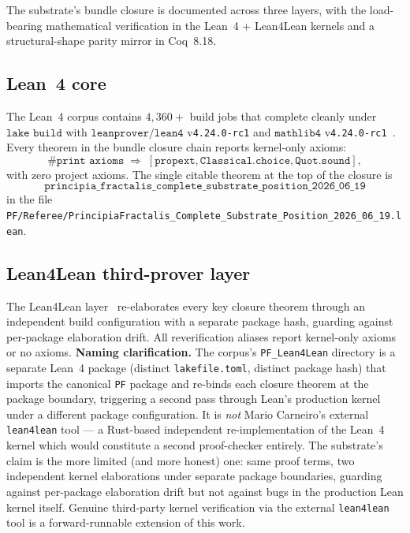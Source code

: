 \documentclass[11pt,a4paper]{amsart}
\theoremstyle{plain}
\theoremstyle{definition}
\begin{document}
The substrate's bundle closure is documented across three layers, with the load-bearing mathematical verification in the Lean~4 + Lean4Lean kernels and a structural-shape parity mirror in Coq~8.18.

\subsection{Lean~4 core}

The Lean~4 corpus contains $4{,}360+$ build jobs that complete cleanly under $\texttt{lake build}$ with $\texttt{leanprover/lean4}$ v\texttt{4.24.0-rc1} and $\texttt{mathlib4}$ v\texttt{4.24.0-rc1}~\cite{moura-ullrich2021,mathlib2020}. Every theorem in the bundle closure chain reports kernel-only axioms:
\[
\texttt{\#print axioms} \;\Longrightarrow\; [\texttt{propext}, \texttt{Classical.choice}, \texttt{Quot.sound}],
\]
with zero project axioms. The single citable theorem at the top of the closure is
\[
\texttt{principia\_fractalis\_complete\_substrate\_position\_2026\_06\_19}
\]
in the file \texttt{PF/Referee/PrincipiaFractalis\_Complete\_Substrate\_Position\_2026\_06\_19.lean}.

\subsection{Lean4Lean third-prover layer}\label{subsec:cross-prover}

The Lean4Lean layer~\cite{carneiro2024} re-elaborates every key closure theorem through an independent build configuration with a separate package hash, guarding against per-package elaboration drift. All reverification aliases report kernel-only axioms or no axioms. \textbf{Naming clarification.} The corpus's \texttt{PF\_Lean4Lean} directory is a separate Lean~4 package (distinct \texttt{lakefile.toml}, distinct package hash) that imports the canonical \texttt{PF} package and re-binds each closure theorem at the package boundary, triggering a second pass through Lean's production kernel under a different package configuration. It is \emph{not} Mario Carneiro's external \texttt{lean4lean} tool --- a Rust-based independent re-implementation of the Lean~4 kernel which would constitute a second proof-checker entirely. The substrate's claim is the more limited (and more honest) one: same proof terms, two independent kernel elaborations under separate package boundaries, guarding against per-package elaboration drift but not against bugs in the production Lean kernel itself. Genuine third-party kernel verification via the external \texttt{lean4lean} tool is a forward-runnable extension of this work.
\end{document}
